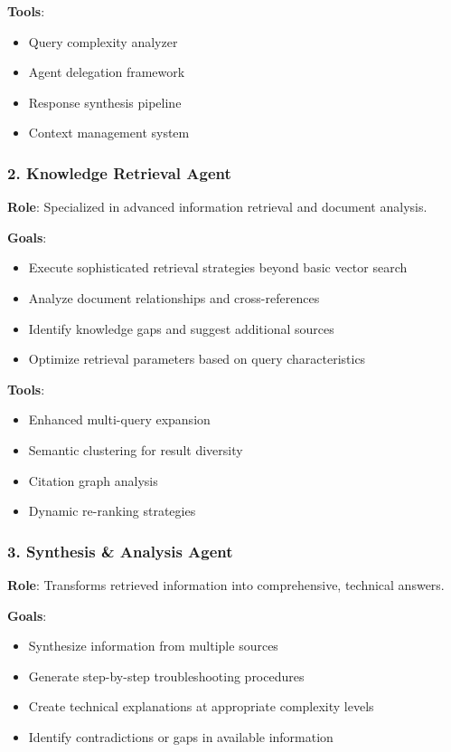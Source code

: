\documentclass[11pt, a4paper]{article}
\begin{document}
\textbf{Tools}:
\begin{itemize}
    \item Query complexity analyzer
    \item Agent delegation framework
    \item Response synthesis pipeline
    \item Context management system
\end{itemize}

\subsubsection{2. Knowledge Retrieval Agent}
\textbf{Role}: Specialized in advanced information retrieval and document analysis.

\textbf{Goals}:
\begin{itemize}
    \item Execute sophisticated retrieval strategies beyond basic vector search
    \item Analyze document relationships and cross-references
    \item Identify knowledge gaps and suggest additional sources
    \item Optimize retrieval parameters based on query characteristics
\end{itemize}

\textbf{Tools}:
\begin{itemize}
    \item Enhanced multi-query expansion
    \item Semantic clustering for result diversity
    \item Citation graph analysis
    \item Dynamic re-ranking strategies
\end{itemize}

\subsubsection{3. Synthesis \& Analysis Agent}
\textbf{Role}: Transforms retrieved information into comprehensive, technical answers.

\textbf{Goals}:
\begin{itemize}
    \item Synthesize information from multiple sources
    \item Generate step-by-step troubleshooting procedures
    \item Create technical explanations at appropriate complexity levels
    \item Identify contradictions or gaps in available information
\end{itemize}
\end{document}
